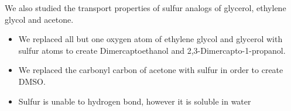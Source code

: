 \documentclass{article}
\begin{document}
  We also studied the transport properties of sulfur analogs of glycerol, ethylene
  glycol and acetone.
  \begin{itemize}
    \item We replaced all but one oxygen atom of ethylene glycol and glycerol with sulfur atoms
    to create Dimercaptoethanol and 2,3-Dimercapto-1-propanol.
    \item We replaced the carbonyl carbon of acetone with sulfur in order to create DMSO. 
  	\item Sulfur is unable to hydrogen bond, however it is soluble in water  %
 \end{itemize}
  	
  
\end{document}
